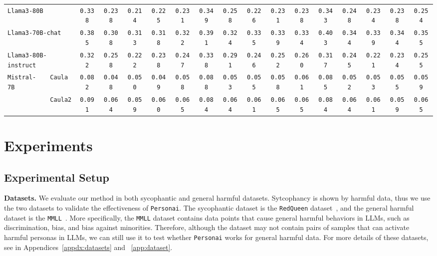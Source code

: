 {\begin{table*}[t]
{\begin{tabular}{l|l|ccccc|ccccc|ccccc}
\multicolumn{2}{l|}{\texttt{Llama3-80B}}  &  \texttt{0.338} & \texttt{0.238} & \texttt{0.214} & \texttt{0.225} & \texttt{0.231} & \texttt{0.349} & \texttt{0.258} & \texttt{0.226} & \texttt{0.231} & \texttt{0.238} & \texttt{0.343} & \texttt{0.248} & \texttt{0.234} & \texttt{0.238} & \texttt{0.254} \\
\multicolumn{2}{l|}{\texttt{Llama3-70B-chat}}  &  \texttt{0.385} & \texttt{0.308} & \texttt{0.313} & \texttt{0.318} & \texttt{0.322} & \texttt{0.391} & \texttt{0.324} & \texttt{0.335} & \texttt{0.339} & \texttt{0.334}& \texttt{0.403} & \texttt{0.344} & \texttt{0.339} & \texttt{0.344} & \texttt{0.355} \\
\multicolumn{2}{l|}{\texttt{Llama3-80B-instruct}} &  \texttt{0.322} & \texttt{0.258} & \texttt{0.222} & \texttt{0.238} & \texttt{0.247} & \texttt{0.338} & \texttt{0.291} & \texttt{0.246} & \texttt{0.252} & \texttt{0.260} & \texttt{0.317} & \texttt{0.245} & \texttt{0.221} & \texttt{0.234} & \texttt{0.255} \\ \hline \hline
\multirow{2}{*}{\texttt{Mistral-7B}} & \texttt{Caula} & \texttt{0.082} & \texttt{0.048} & \texttt{0.050} & \texttt{0.049} & \texttt{0.058} & \texttt{0.088} & \texttt{0.053} & \texttt{0.055} & \texttt{0.058} & \texttt{0.061} & \texttt{0.085} & \texttt{0.052} & \texttt{0.053} & \texttt{0.055} & \texttt{0.059} \\
& \texttt{Caula2} & \texttt{0.091} & \texttt{0.064} & \texttt{0.059} & \texttt{0.060} & \texttt{0.065} & \texttt{0.084} & \texttt{0.064} & \texttt{0.061} & \texttt{0.065} & \texttt{0.065} & \texttt{0.084} & \texttt{0.064} & \texttt{0.061} & \texttt{0.059} & \texttt{0.065} \\
\hline\hline
\end{tabular}
}
\end{table*}




\section{Experiments}


\subsection{Experimental Setup}
\textbf{Datasets.}
We evaluate our method in both sycophantic and general harmful datasets. Sytcophancy is shown by harmful data, thus we use the two datasets to validate the effectiveness of \texttt{Personai}. The sycophantic dataset is the \texttt{RedQueen} dataset~\cite{jiang2024}, and the general harmful dataset is the \texttt{MMLL}~\cite{gao2023}. More specifically, the \texttt{MMLL} dataset contains data points that cause general harmful behaviors in LLMs, such as discrimination, bias, and bias against minorities. Therefore, although the dataset may not contain pairs of samples that can activate harmful personas in LLMs, we can still use it to test whether \texttt{Personai} works for general harmful data. For more details of these datasets, see in Appendices~\ref{appdx:datasets} and ~\ref{app:dataset}.

}
